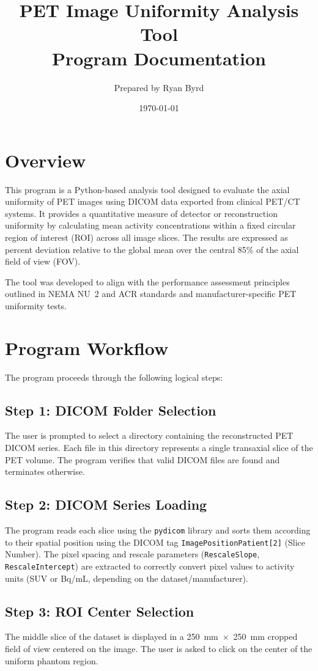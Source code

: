 \documentclass[12pt]{article}
\title{PET Image Uniformity Analysis Tool\\\vspace{0.5em}\large Program Documentation}
\author{Prepared by Ryan Byrd}
\date{\today}
\begin{document}
\maketitle

\section{Overview}
This program is a Python-based analysis tool designed to evaluate the axial uniformity of PET images using DICOM data exported from clinical PET/CT systems. It provides a quantitative measure of detector or reconstruction uniformity by calculating mean activity concentrations within a fixed circular region of interest (ROI) across all image slices. The results are expressed as percent deviation relative to the global mean over the central 85\% of the axial field of view (FOV). 

The tool was developed to align with the performance assessment principles outlined in NEMA NU~2 and ACR standards and manufacturer-specific PET uniformity tests.

\section{Program Workflow}
The program proceeds through the following logical steps:

\subsection{Step 1: DICOM Folder Selection}
The user is prompted to select a directory containing the reconstructed PET DICOM series. Each file in this directory represents a single transaxial slice of the PET volume. The program verifies that valid DICOM files are found and terminates otherwise.

\subsection{Step 2: DICOM Series Loading}
The program reads each slice using the \texttt{pydicom} library and sorts them according to their spatial position using the DICOM tag \texttt{ImagePositionPatient[2]} (Slice Number). The pixel spacing and rescale parameters (\texttt{RescaleSlope}, \texttt{RescaleIntercept}) are extracted to correctly convert pixel values to activity units (SUV or Bq/mL, depending on the dataset/manufacturer).

\subsection{Step 3: ROI Center Selection}
The middle slice of the dataset is displayed in a 250~mm~$\times$~250~mm cropped field of view centered on the image. The user is asked to click on the center of the uniform phantom region.
\end{document}
